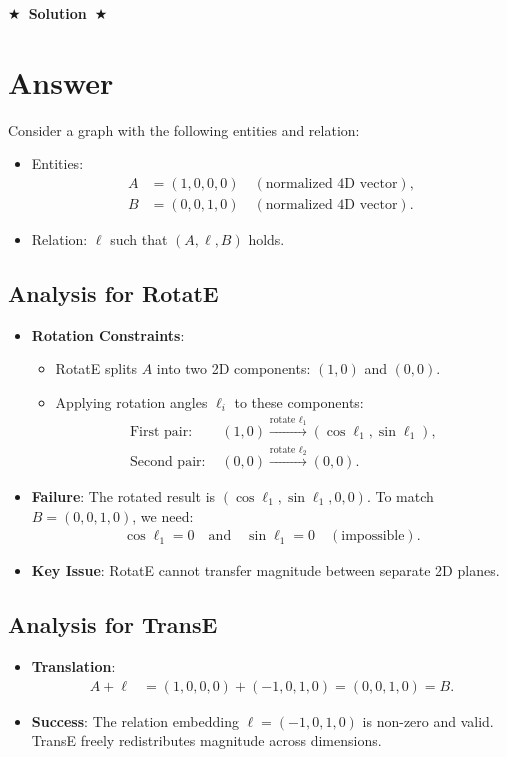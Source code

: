 \documentclass[11pt]{article}
\numberwithin{figure}{section}
\newcommand{\Solution}[1]{{\medskip \color{red} \bf $\bigstar$~\sf \textbf{Solution}~$\bigstar$ \sf #1 } \bigskip}
\begin{document}
\Solution{}
\section*{Answer}

Consider a graph with the following entities and relation:
\begin{itemize}
  \item Entities: 
    \begin{align*}
      A &= (1, 0, 0, 0) \quad (\text{normalized 4D vector}), \\
      B &= (0, 0, 1, 0) \quad (\text{normalized 4D vector}).
    \end{align*}
  \item Relation: $\ell$ such that $(A, \ell, B)$ holds.
\end{itemize}

\subsection*{Analysis for RotatE}
\begin{itemize}
  \item \textbf{Rotation Constraints}: 
    \begin{itemize}
      \item RotatE splits $A$ into two 2D components: $(1, 0)$ and $(0, 0)$. 
      \item Applying rotation angles $\ell_i$ to these components:
        \begin{align*}
          \text{First pair: } &(1, 0) \xrightarrow{\text{rotate } \ell_1} (\cos \ell_1, \sin \ell_1), \\
          \text{Second pair: } &(0, 0) \xrightarrow{\text{rotate } \ell_2} (0, 0).
        \end{align*}
    \end{itemize}
  \item \textbf{Failure}: The rotated result is $(\cos \ell_1, \sin \ell_1, 0, 0)$. To match $B = (0, 0, 1, 0)$, we need:
    \begin{align*}
      \cos \ell_1 = 0 \quad \text{and} \quad \sin \ell_1 = 0 \quad (\text{impossible}).
    \end{align*}
  \item \textbf{Key Issue}: RotatE cannot transfer magnitude between separate 2D planes.
\end{itemize}

\subsection*{Analysis for TransE}
\begin{itemize}
  \item \textbf{Translation}: 
    \begin{align*}
      A + \ell &= (1, 0, 0, 0) + (-1, 0, 1, 0) = (0, 0, 1, 0) = B.
    \end{align*}
  \item \textbf{Success}: The relation embedding $\ell = (-1, 0, 1, 0)$ is non-zero and valid. TransE freely redistributes magnitude across dimensions.
\end{itemize}
\end{document}
